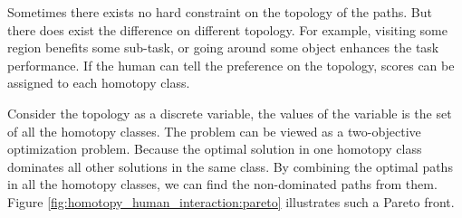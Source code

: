 \documentclass[letterpaper, 10 pt, conference]{ieeeconf}
\begin{document}
Sometimes there exists no hard constraint on the topology of the paths.
But there does exist the difference on different topology.
For example, visiting some region benefits some sub-task, or going around some object enhances the task performance.
If the human can tell the preference on the topology, scores can be assigned to each homotopy class.

Consider the topology as a discrete variable, the values of the variable is the set of all the homotopy classes.
The problem can be viewed as a two-objective optimization problem.
Because the optimal solution in one homotopy class dominates all other solutions in the same class.
By combining the optimal paths in all the homotopy classes, we can find the non-dominated paths from them.
Figure \ref{fig:homotopy_human_interaction:pareto} illustrates such a Pareto front.
\end{document}
